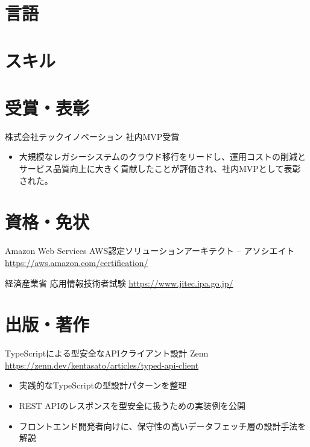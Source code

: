 \documentclass[a4paper, serif, 10pt]{moderncv}
\begin{document}
\section{言語}

\section{スキル}

\section{受賞・表彰}

        {株式会社テックイノベーション}
        {社内MVP受賞}
        {}
        {}
        {\begin{itemize}
\item 大規模なレガシーシステムのクラウド移行をリードし、運用コストの削減とサービス品質向上に大きく貢献したことが評価され、社内MVPとして表彰された。
\end{itemize}}
\section{資格・免状}

        {Amazon Web Services}
        {AWS認定ソリューションアーキテクト – アソシエイト}
        {\url{https://aws.amazon.com/certification/}}
        {}
        {}

        {経済産業省}
        {応用情報技術者試験}
        {\url{https://www.jitec.ipa.go.jp/}}
        {}
        {}
\section{出版・著作}

        {TypeScriptによる型安全なAPIクライアント設計}
        {Zenn}
        {\url{https://zenn.dev/kentasato/articles/typed-api-client}}
        {}
        {\begin{itemize}
\item 実践的なTypeScriptの型設計パターンを整理
\item REST APIのレスポンスを型安全に扱うための実装例を公開
\item フロントエンド開発者向けに、保守性の高いデータフェッチ層の設計手法を解説
\end{itemize}}
\end{document}
